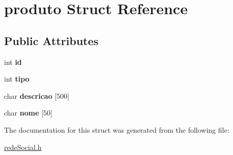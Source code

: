 \hypertarget{structproduto}{}\section{produto Struct Reference}
\label{structproduto}
\subsection*{Public Attributes}
\begin{DoxyCompactItemize}
\item 
\mbox{\label{structproduto_afda9eec7aba2d91219870174a360dd99}} 
int {\bfseries id}
\item 
\mbox{\label{structproduto_a9162fccef5136b76f7e0a43220301b82}} 
int {\bfseries tipo}
\item 
\mbox{\label{structproduto_a1ee9c525762972da3408471fcc74e52c}} 
char {\bfseries descricao} \mbox{[}500\mbox{]}
\item 
\mbox{\label{structproduto_a73f5751f0cdfedb0ddf20ca606151f8a}} 
char {\bfseries nome} \mbox{[}50\mbox{]}
\end{DoxyCompactItemize}


The documentation for this struct was generated from the following file\+:\begin{DoxyCompactItemize}
\item 
\hyperlink{rede_social_8h}{rede\+Social.\+h}\end{DoxyCompactItemize}
